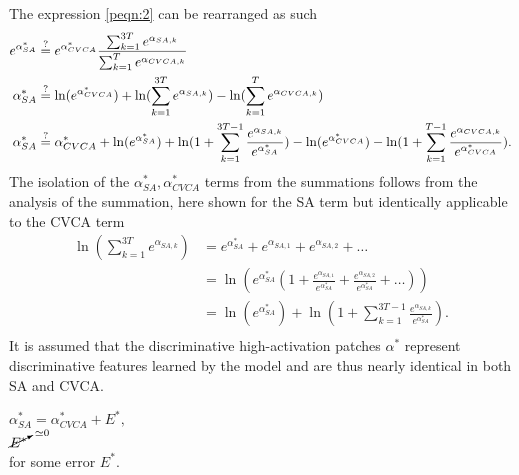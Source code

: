 The expression \ref{peqn:2} can be rearranged as such
\begin{align}
    e^{\alpha^*_{SA}} & \stackrel{?}{=} e^{\alpha^*_{CVCA}} \frac{\sum_{k=1}^{3T} e^{\alpha_{SA,k}}}{\sum_{k=1}^{T} e^{\alpha_{CVCA,k}}} \nonumber \\
    \alpha^*_{SA} & \stackrel{?}{=} \ln (e^{\alpha^*_{CVCA}}) + \ln (\sum_{k=1}^{3T} e^{\alpha_{SA,k}}) - \ln (\sum_{k=1}^{T} e^{\alpha_{CVCA,k}}) \nonumber \\
    \alpha^*_{SA} & \stackrel{?}{=} \alpha^*_{CVCA} + \ln (e^{\alpha^*_{SA}}) + \ln (1 + \sum_{k=1}^{3T-1} \frac{e^{\alpha_{SA,k}}}{e^{\alpha^*_{SA}}}) - \ln (e^{\alpha^*_{CVCA}}) - \ln (1 + \sum_{k=1}^{T-1} \frac{e^{\alpha_{CVCA,k}}}{e^{\alpha^*_{CVCA}}}). \label{peqn:3}
\end{align}
The isolation of the $\alpha^*_{SA}, \alpha^*_{CVCA}$ terms from the summations follows from the analysis of the summation, here shown for the SA term but identically applicable to the CVCA term
\begin{equation}
\begin{aligned}
    \ln (\sum_{k=1}^{3T} e^{\alpha_{SA,k}}) & = e^{\alpha^*_{SA}} + e^{\alpha_{SA,1}} + e^{\alpha_{SA,2}} + \dots \\
    & = \ln (e^{\alpha^*_{SA}} (1 + \frac{e^{\alpha_{SA,1}}}{e^{\alpha^*_{SA}}} + \frac{e^{\alpha_{SA,2}}}{e^{\alpha^*_{SA}}} + \dots)) \\
    & = \ln (e^{\alpha^*_{SA}}) + \ln (1 + \sum_{k=1}^{3T-1} \frac{e^{\alpha_{SA,k}}}{e^{\alpha^*_{SA}}}). \\
\end{aligned}
\end{equation}
It is assumed that the discriminative high-activation patches $\alpha^*$ represent discriminative features learned by the model and are thus nearly identical in both SA and CVCA.
\begin{assumption}
    $\alpha^*_{SA} = \alpha^*_{CVCA} + E^*,$ \\
    $\cancelto{\simeq 0}{E^*}$ \\
    for some error $E^*$.
\label{pass:1}
\end{assumption}
